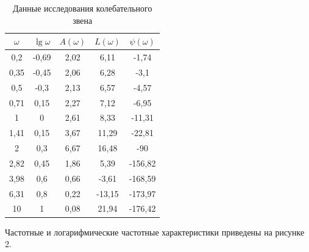 \documentclass[a4paper, 11pt, russian]{article}
\begin{document}
    \begin{table}[ht!]
        \flushleft
        \caption{Данные исследования колебательного звена}
        \begin{tabular}{|c|c|c|c|c|}
        	\hline
            $\omega$ & $\lg{\omega}$ & $A(\omega)$ & $L(\omega)$ & $\psi(\omega)$\\
            \hline
            0,2 & -0,69 & 2,02 & 6,11 & -1,74\\
            \hline
            0,35 & -0,45 & 2,06 & 6,28 & -3,1\\
            \hline
            0,5 & -0,3 & 2,13 & 6,57 & -4,57\\
            \hline
            0,71 & 0,15 & 2,27 & 7,12 & -6,95\\
            \hline
            1 & 0 & 2,61 & 8,33 & -11,31\\
            \hline
            1,41 & 0,15 & 3,67 & 11,29 & -22,81\\
            \hline
            2 & 0,3 & 6,67 & 16,48 & -90\\ %
            \hline
            2,82 & 0,45 & 1,86 & 5,39 & -156,82\\
            \hline
            3,98 & 0,6 & 0,66 & -3,61 & -168,59\\
            \hline
            6,31 & 0,8 & 0,22 & -13,15 & -173,97\\
            \hline
            10 & 1 & 0,08 & 21,94 & -176,42\\
            \hline
        \end{tabular}
    \end{table}
    \newpage
    Частотные и логарифмические частотные характеристики приведены на рисунке 2.
\end{document}
